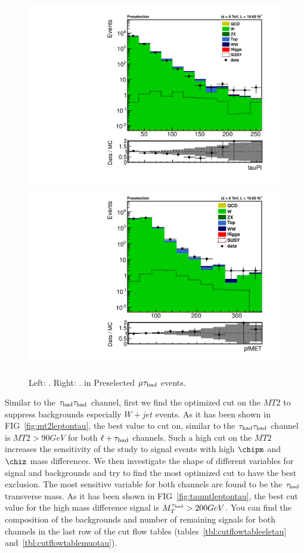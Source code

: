\begin{figure}[htbp]
\centering
\includegraphics[angle=0,scale=0.35]{SelectionMuTau/tauPt_muTau.pdf}
\includegraphics[angle=0,scale=0.35]{SelectionMuTau/pfMET_muTau.pdf}
\caption{Left: \Tau\PT. Right: \MET. in Preselected $\mu\tau_{\rm had}$ events.}
\label{fig:datamcmuotau}
\end{figure}

Similar to the $\tau_{\rm had}\tau_{\rm had}$ channel, first we find the optimized cut on the $MT2$ to suppress backgrounds especially $W+jet$ events. As it has been shown in FIG~\ref{fig:mt2leptontau}, the best value to cut on, similar to the $\tau_{\rm had}\tau_{\rm had}$ channel is $MT2 > 90 GeV$ for both $\ell+\tau_{\rm had}$ channels. Such a high cut on the $MT2$ increases the sensitivity of the study to signal events with high $\chipm$ and $\chiz$ mass differences. We then investigate the shape of different variables for signal and backgrounds and try to find the most optimized cut to have the best exclusion. The most sensitive variable for both channels are found to be the $\tau_{\rm had}$ transverse mass. As it has been shown in FIG~\ref{fig:taumtleptontau}, the best cut value for the high mass difference signal is $M_{T}^{\tau_{\rm had}} > 200 GeV$. You can find the composition of the backgrounds and number of remaining signals for both channels in the last row of the cut flow tables (tables~\ref{tbl:cutflowtableeletau} and~\ref{tbl:cutflowtablemuotau}).

